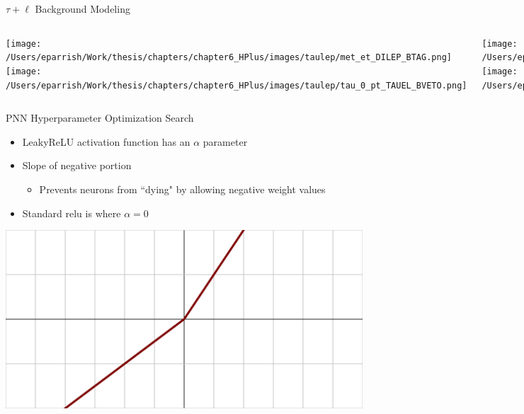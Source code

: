 \documentclass[aspectratio=169,xcolor=table]{beamer}
\begin{document}
    \begin{frame}[t]{$\tau+\ell$ Background Modeling}
      \begin{columns}[t]

        \texttt{[image: /Users/eparrish/Work/thesis/chapters/chapter6\_HPlus/images/taulep/met\_et\_DILEP\_BTAG.png]}
        \texttt{[image: /Users/eparrish/Work/thesis/chapters/chapter6\_HPlus/images/taulep/tau\_0\_pt\_TAUEL\_BVETO.png]}

        \texttt{[image: /Users/eparrish/Work/thesis/chapters/chapter6\_HPlus/images/taulep/lep\_0\_pt\_DILEP\_BTAG.png]}
        \texttt{[image: /Users/eparrish/Work/thesis/chapters/chapter6\_HPlus/images/taulep/lep\_0\_pt\_TAUEL\_BVETO.png]}

        \texttt{[image: /Users/eparrish/Work/thesis/chapters/chapter6\_HPlus/images/taulep/tau\_0\_pt\_SS\_TAUEL.png]}
        \texttt{[image: /Users/eparrish/Work/thesis/chapters/chapter6\_HPlus/images/taulep/tau\_0\_pt\_SS\_TAUMU.png]}


        \texttt{[image: /Users/eparrish/Work/thesis/chapters/chapter6\_HPlus/images/taulep/lep\_0\_pt\_SS\_TAUEL.png]}
        \texttt{[image: /Users/eparrish/Work/thesis/chapters/chapter6\_HPlus/images/taulep/lep\_0\_pt\_SS\_TAUMU.png]}

      \end{columns}
    \end{frame}

      \begin{frame}[t]{PNN Hyperparameter Optimization Search}
      \begin{itemize}
        \item LeakyReLU activation function has an $\alpha$ parameter
        \item Slope of negative portion
        \begin{itemize}
          \item Prevents neurons from ``dying" by allowing negative weight values
        \end{itemize}
        \item Standard relu is where $\alpha=0$
      \end{itemize}
      \centering
      \includegraphics[height=.4\textheight,keepaspectratio=true]{Activation_prelu.svg.png}
    \end{frame}
\end{document}
